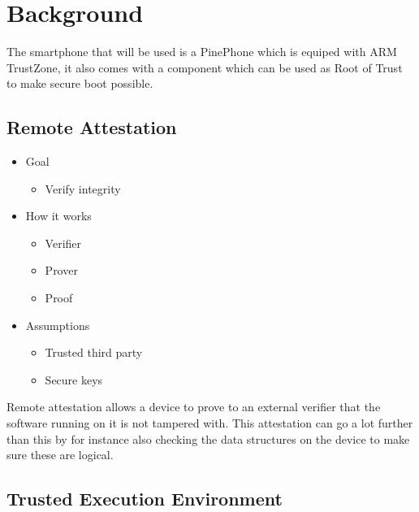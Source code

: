 \documentclass{report}
\begin{document}
\chapter{Background}

The smartphone that will be used is a PinePhone which is equiped with ARM TrustZone, it also comes with a component which can be used as Root of Trust to make secure boot possible. 

\section{Remote Attestation}

\begin{itemize}
\item Goal \begin{itemize}
\item Verify integrity
\end{itemize}
\item How it works \begin{itemize}
\item Verifier
\item Prover
\item Proof
\end{itemize}
\item Assumptions \begin{itemize}
\item Trusted third party
\item Secure keys
\end{itemize}
\end{itemize}

Remote attestation allows a device to prove to an external verifier that the software running on it is not tampered with. This attestation can go a lot further than this by for instance also checking the data structures on the device to make sure these are logical.

\section{Trusted Execution Environment}
\end{document}
